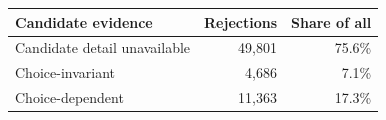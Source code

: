   \renewcommand{\theHreporttablerow}{rq6_mut_choice_sensitivity.\arabic{reporttablerow}}
  \setcounter{reporttablerow}{0}
  \begin{tabular}{lrr}
  \toprule
  Candidate evidence & Rejections & Share of all \\
  \midrule
  {reporttablerow}\label{tabrow:rq6_mut_choice_sensitivity:Candidate@20detail@20unavailable}Candidate detail unavailable & 49,801 & 75.6\% \\
  {reporttablerow}\label{tabrow:rq6_mut_choice_sensitivity:Choice-invariant}Choice-invariant & 4,686 & 7.1\% \\
  {reporttablerow}\label{tabrow:rq6_mut_choice_sensitivity:Choice-dependent}Choice-dependent & 11,363 & 17.3\% \\
  \bottomrule
  \end{tabular}
